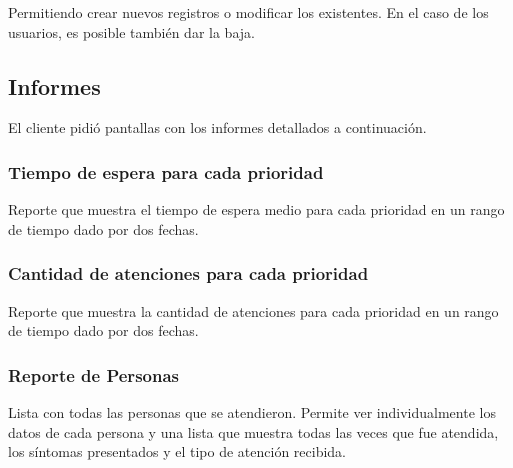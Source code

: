 Permitiendo crear nuevos registros o modificar los existentes. En el caso de los usuarios, es posible también dar la baja.\\

 


\subsection{Informes}
El cliente pidió pantallas con los informes detallados a continuación.\\
\subsubsection{Tiempo de espera para cada prioridad}
Reporte que muestra el tiempo de espera medio para cada prioridad en un rango de tiempo dado por dos fechas. 
\subsubsection{Cantidad de atenciones para cada prioridad}
Reporte que muestra la cantidad de atenciones para cada prioridad en un rango de tiempo dado por dos fechas.
\subsubsection{Reporte de Personas}
Lista con todas las personas que se atendieron. Permite ver individualmente los datos de cada persona y una lista que muestra todas las veces que fue atendida, los síntomas presentados y el tipo de atención recibida.